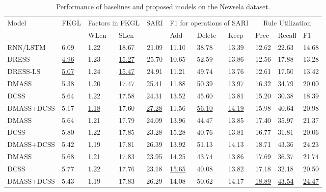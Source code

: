 \documentclass[11pt,a4paper]{article}
\begin{document}
\begin{table*}[!h]
\fontsize{9}{9}\selectfont
\centering
\renewcommand{\arraystretch}{1.3}
\begin{tabular}{|l|l|ll|l|lll|lll|}
\hline
\multirow{2}{*}{Model} & \multicolumn{1}{c|}{\multirow{2}{*}{FKGL}} & \multicolumn{2}{c|}{Factors in FKGL} & \multicolumn{1}{c|}{\multirow{2}{*}{SARI}} & \multicolumn{3}{c|}{F1 for operations of SARI} & \multicolumn{3}{c|}{Rule Utilization} \\ \cline{3-4} \cline{6-11} 
 & \multicolumn{1}{c|}{} & \multicolumn{1}{l|}{WLen} & SLen & \multicolumn{1}{c|}{} & \multicolumn{1}{l|}{Add} & \multicolumn{1}{l|}{Delete} & Keep & \multicolumn{1}{l|}{Prec} & \multicolumn{1}{l|}{Recall} & F1 \\ \hline
RNN/LSTM & 6.09 & 1.22 & 18.67 & \multicolumn{1}{c|}{21.09} & 11.10 & 38.78 & 13.39 & 12.62 & 22.63 & 14.68 \\
DRESS & \underline{4.96} & 1.23 & \underline{15.27} & \multicolumn{1}{c|}{25.70} & 10.65 & 52.59 & 13.86 & 12.56 & 17.88 & 13.28 \\
DRESS-LS & \underline{5.07} & 1.24 & \underline{15.47} & \multicolumn{1}{c|}{24.91} & 11.21 & 49.74 & 13.76 & 12.61 & 17.50 & 13.42 \\ \hline
DMASS & 5.38 & 1.20 & 17.47 & 25.41 & 11.88 & 50.39 & 13.97 & 16.32 & 34.79 & 20.00 \\
DCSS & 5.64 & 1.22 & 17.58 & 24.31 & 13.52 & 45.60 & 13.81 & 15.20 & 30.38 & 18.39 \\
DMASS+DCSS & 5.17 & \underline{1.18} & 17.60 & \underline{27.28} & 11.56 & \underline{56.10} & \underline{14.19} & 15.98 & 40.64 & 20.98 \\ \hline
DMASS & 5.64 & 1.21 & 17.79 & 24.09 & 13.96 & 44.47 & 13.85 & 17.40 & 35.97 & 21.37 \\
DCSS & 5.80 & 1.22 & 17.85 & 23.28 & 15.28 & 40.76 & 13.81 & 16.77 & 31.81 & 20.06 \\
DMASS+DCSS & 5.42 & 1.19 & 17.81 & 26.39 & 13.92 & 51.13 & 14.13 & 18.71 & 43.36 & 24.23 \\ \hline
DMASS & 5.68 & 1.21 & 17.83 & 23.95 & 14.25 & 43.74 & 13.86 & 17.69 & 36.37 & 21.74 \\
DCSS & 5.77 & 1.22 & 17.76 & 23.18 & \underline{15.65} & 40.08 & 13.82 & 17.18 & 32.18 & 20.50 \\
DMASS+DCSS & 5.43 & 1.19 & 17.83 & 26.29 & 14.08 & 50.62 & 14.17 & \underline{18.89} & \underline{43.54} & \underline{24.47} \\ \hline
\end{tabular}
\caption{Performance of baselines and proposed models on the Newsela dataset.}
\label{tab:perf_newsela}
\end{table*}
\end{document}
